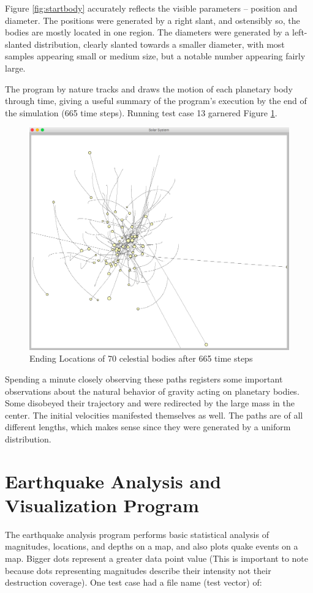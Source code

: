 Figure \ref{fig:startbody} accurately reflects the visible parameters – position and diameter. The positions were generated by a right slant, and ostensibly so, the bodies are mostly located in one region. The diameters were generated by a left-slanted distribution, clearly slanted towards a smaller diameter, with most samples appearing small or medium size, but a notable number appearing fairly large.

The program by nature tracks and draws the motion of each planetary body through time, giving a useful summary of the program’s execution by the end of the simulation (665 time steps). Running test case 13 garnered Figure \ref{fig:endbody}.

\begin{figure}[h!]
\centering
\includegraphics[scale=0.4]{final-ex.png}
\caption{Ending Locations of 70 celestial bodies after 665 time steps}
\label{fig:endbody}
\end{figure}

Spending a minute closely observing these paths registers some important observations about the natural behavior of gravity acting on planetary bodies. Some disobeyed their trajectory and were redirected by the large mass in the center. The initial velocities manifested themselves as well. The paths are of all different lengths, which makes sense since they were generated by a uniform distribution.

\section{Earthquake Analysis and Visualization Program}
The earthquake analysis program performs basic statistical analysis of magnitudes, locations, and depths on a map, and also plots quake events on a map. Bigger dots represent a greater data point value (This is important to note because dots representing magnitudes describe their intensity not their destruction coverage). One test case had a file name (test vector) of:
\vspace{1cm}

